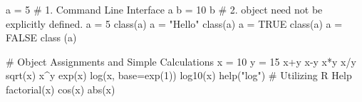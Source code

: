 a = 5
# 1. Command Line Interface
a
b = 10
b
# 2. object need not be explicitly defined.
a = 5
class(a)
a = "Hello"
class(a)
a = TRUE
class(a)
a = FALSE
class (a)

# Object Assignments and Simple Calculations
x = 10
y = 15
x+y
x-y
x*y
x/y
sqrt(x)
x^y
exp(x)
log(x, base=exp(1))
log10(x)
help("log") # Utilizing R Help
factorial(x)
cos(x)
abs(x)